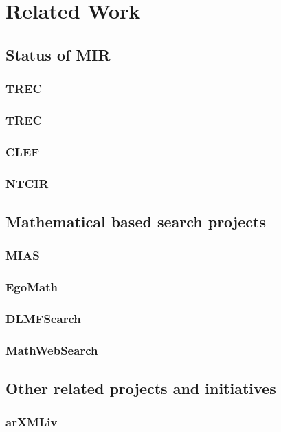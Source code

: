 \chapter{Related Work}
\label{chapter-related_work}
\section{Status of MIR}
\subsection{TREC}
\subsection{TREC}
\subsection{CLEF}
\subsection{NTCIR}
\section{Mathematical based search projects}
\subsection{MIAS}
\subsection{EgoMath}
\subsection{DLMFSearch}
\subsection{MathWebSearch}
\section{Other related projects and initiatives}
\subsection{arXMLiv}
\thispagestyle{empty}



